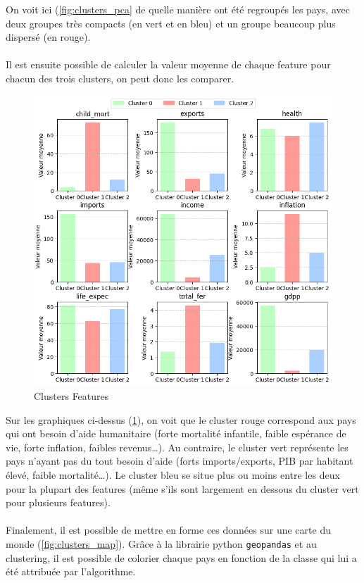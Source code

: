 \documentclass{article}
\begin{document}
\noindent On voit ici (\ref{fig:clusters_pca} de quelle manière ont été regroupés les pays, avec deux groupes très compacts (en vert et en bleu) et un groupe beaucoup plus dispersé (en rouge). \\ \\
Il est ensuite possible de calculer la valeur moyenne de chaque feature pour chacun des trois clusters, on peut donc les comparer.

\begin{figure}[H]
    \centering
    \includegraphics[width=\linewidth]{plot/clusters_features.png}
    \caption{Clusters Features}
    \label{fig:clusters_features}
\end{figure}

\noindent Sur les graphiques ci-dessus (\ref{fig:clusters_features}), on voit que le cluster rouge correspond aux pays qui ont besoin d’aide humanitaire (forte mortalité infantile, faible espérance de vie, forte inflation, faibles revenus…). Au contraire, le cluster vert représente les pays n’ayant pas du tout besoin d’aide (forts imports/exports, PIB par habitant élevé, faible mortalité…). Le cluster bleu se situe plus ou moins entre les deux pour la plupart des features (même s’ils sont largement en dessous du cluster vert pour plusieurs features). \\ \\
Finalement, il est possible de mettre en forme ces données sur une carte du monde (\ref{fig:clusters_map}). Grâce à la librairie python \texttt{geopandas} et au clustering, il est possible de colorier chaque pays en fonction de la classe qui lui a été attribuée par l’algorithme.
\end{document}
